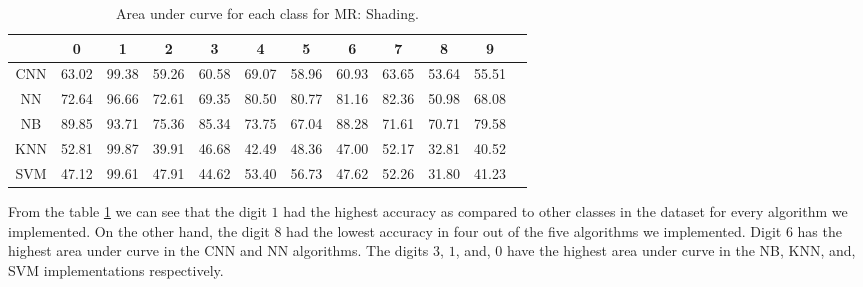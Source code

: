     \begin{table}[H]
    \centering
    \begin{tabular}{|c|c|c|c|c|c|c|c|c|c|c|c|}
    \hline
     & 0 & 1 & 2 & 3 & 4 & 5 & 6 & 7 & 8 & 9 \\
    \hline
    CNN & 63.02 & \cellcolor{green!25}99.38 & 59.26 & 60.58 & 69.07 & 58.96 & 60.93 & 63.65 & \cellcolor{red!25}53.64 & 55.51 \\ 
    \hline
    NN & 72.64 & \cellcolor{green!25}96.66 & 72.61 & 69.35 & 80.50 & 80.77 & 81.16 & 82.36 & \cellcolor{red!25}50.98 & 68.08 \\
    \hline
    NB & 89.85 & \cellcolor{green!25}93.71 & 75.36 & 85.34 & 73.75 & \cellcolor{red!25}67.04 & 88.28 & 71.61 & 70.71 & 79.58 \\
    \hline
    KNN & 52.81 & \cellcolor{green!25}99.87 & 39.91 & 46.68 & 42.49 & 48.36 & 47.00 & 52.17 & \cellcolor{red!25}32.81 & 40.52 \\
    \hline
    SVM & 47.12 & \cellcolor{green!25}99.61 & 47.91 & 44.62 & 53.40 & 56.73 & 47.62 & 52.26 & \cellcolor{red!25}31.80 & 41.23 \\
    \hline
    \end{tabular}
    \caption{Area under curve for each class for MR: Shading.}
    \label{tbl:test-file-formatShade}
    \end{table}
    From the table \ref{tbl:test-file-formatShade} we can see that the digit $1$ had the highest accuracy as compared to other classes in the dataset for every algorithm we implemented. On the other hand, the digit $8$ had the lowest accuracy in four out of the five algorithms we implemented.
    Digit $6$ has the highest area under curve in the CNN and NN algorithms. The digits $3$, $1$, and, $0$ have the highest area under curve in the NB, KNN, and, SVM implementations respectively.
    
